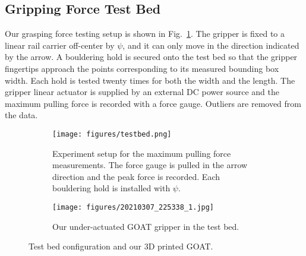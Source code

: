 \documentclass[letterpaper, 10 pt, conference]{ieeeconf}  %
\newcommand{\fig}[1]{Fig.~\ref{#1}}
\newcommand{\RNum}[1]{\uppercase\expandafter{\romannumeral #1\relax}}
\begin{document}
\subsection{Gripping Force Test Bed}
Our grasping force testing setup is shown in \fig{fig:testbed}. The gripper is fixed to a linear rail carrier off-center by $\psi$, and it can only move in the direction indicated by the arrow. A bouldering hold is secured onto the test bed so that the gripper fingertips approach the points corresponding to its measured bounding box width. Each hold is tested twenty times for both the width and the length. The gripper linear actuator is supplied by an external DC power source and the maximum pulling force is recorded with a force gauge. Outliers are removed from the data.



\begin{figure}
    \begin{subfigure}{0.2\textwidth}
    \centering
\texttt{[image: figures/testbed.png]}
\caption{Experiment setup for the maximum pulling force measurements. The force gauge is pulled in the arrow direction and the peak force is recorded. Each bouldering hold is installed with $\psi$.\label{fig:testbed}}
    \end{subfigure}
     \begin{subfigure}{0.23\textwidth}
         \centering
   \texttt{[image: figures/20210307\_225338\_1.jpg]}
   \caption{Our under-actuated GOAT gripper in the test bed.}
     \end{subfigure}
     \caption{Test bed configuration and our 3D printed GOAT.}
\end{figure} 



\end{document}
